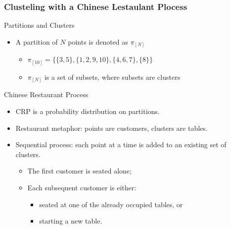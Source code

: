 \begin{frame}
    \frametitle{Clusteling with a Chinese Lestaulant Plocess}
    
    \begin{block}{Partitions and Clusters}
        \begin{itemize}
            \item A partition of $N$ points is denoted as $\pi_{[N]}$
            \begin{itemize}
                \item $\pi_{[10]} = \{\{3,5\},\{1,2,9,10\},\{4,6,7\},\{8\}\}$
                \item $\pi_{[N]}$ is a set of subsets, where subsets are clusters
            \end{itemize}
        \end{itemize}
    \end{block}

    \begin{block}{Chinese Restaurant Process}
        \begin{itemize}
            \item CRP is a probability distribution on partitions.
            \item Restaurant metaphor: points are customers, clusters are tables.
            \item Sequential process: each point at a time is added to an existing set of clusters.
            \begin{itemize}
                \item The first customer is seated alone;
                \item Each subsequent customer is either:
                \begin{itemize}
                    \item seated at one of the already occupied tables, or
                    \item starting a new table.
                \end{itemize}
            \end{itemize}   
        \end{itemize}
    \end{block}
\end{frame}
